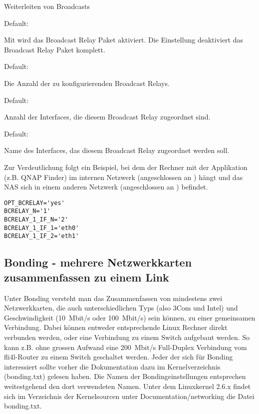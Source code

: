 \begin{description}

 Weiterleiten von Broadcasts

  Default: 

  Mit  wird das Broadcast Relay Paket aktiviert. Die Einstellung
   deaktiviert das Broadcast Relay Paket komplett.


  Default: 

  Die Anzahl der zu konfigurierenden Broadcast Relays.


  Default: 

  Anzahl der Interfaces, die diesem Broadcast Relay zugeordnet sind.


  Default: 

  Name des Interfaces, das diesem Broadcast Relay zugeordnet werden soll.

\end{description}

Zur Verdeutlichung folgt ein Beispiel, bei dem der Rechner mit der Applikation
(z.B. QNAP Finder) im internen Netzwerk (angeschlossen an ) hängt und
das NAS sich in einem anderen Netzwerk (angeschlossen an ) befindet.

\begin{example}
\begin{verbatim}
OPT_BCRELAY='yes'
BCRELAY_N='1'
BCRELAY_1_IF_N='2'
BCRELAY_1_IF_1='eth0'
BCRELAY_1_IF_2='eth1'
\end{verbatim}
\end{example}

\subsection{Bonding - mehrere Netzwerkkarten zusammenfassen zu einem Link}

Unter Bonding versteht man das Zusammenfassen von mindestens zwei
Netzwerkkarten, die auch unterschiedlichen Typs (also 3Com und Intel)
und Geschwindigkeit (10~Mbit/s oder 100~Mbit/s) sein können, zu einer
gemeinsamen Verbindung. Dabei können entweder entsprechende Linux
Rechner direkt verbunden werden, oder eine Verbindung zu einem Switch
aufgebaut werden. So kann z.B. ohne grossen Aufwand eine 200~Mbit/s
Full-Duplex Verbindung vom fli4l-Router zu einem Switch geschaltet
werden.  Jeder der sich für Bonding interessiert sollte vorher die
Dokumentation dazu im Kernelverzeichnis (bonding.txt) gelesen
haben. Die Namen der Bondingeinstellungen entsprechen weitestgehend
den dort verwendeten Namen. Unter dem Linuxkernel 2.6.x
findet sich im Verzeichnis der Kernelsourcen unter
Documentation/networking die Datei bonding.txt.

